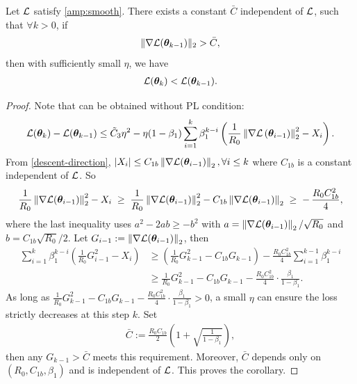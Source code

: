\begin{corollary}\label{cor:nablaL-large}
    Let $\mathcal{L}$ satisfy \cref{amp:smooth}. There exists a constant $\bar{C}$ independent of $\mathcal{L}$, such that $\forall k > 0$, if \begin{align*}
        \|\nabla \mathcal{L}({\bm{\theta}}_{k-1})\|_2 > \bar{C},
    \end{align*}
    then with sufficiently small $\eta$, we have \begin{align*}
        \mathcal{L}({\bm{\theta}}_k) < \mathcal{L}({\bm{\theta}}_{k-1}).
    \end{align*}
\end{corollary}
\begin{proof}
    Note that  can be obtained without PL condition: \begin{align*}
        \mathcal{L}({\bm{\theta}}_{k}) - \mathcal{L}({\bm{\theta}}_{k-1}) \leq \tilde{C}_3 \eta^2 - \eta (1-\beta_1) \sum_{i=1}^{k} \beta_1^{k-i} \left(\frac{1}{R_0}\left\|\nabla\mathcal{L}\left({\bm{\theta}}_{i-1}\right)\right\|_2^2 - X_i\right).
    \end{align*}
    From \cref{descent-direction}, $\left|X_i\right| \leq C_{1b}\left\|\nabla \mathcal{L}({\bm{\theta}}_{i-1})\right\|_2, \forall i \leq k$ where $C_{1b}$ is a constant independent of $\mathcal{L}$. So
\begin{align*}
\frac{1}{R_0}\left\|\nabla\mathcal{L}({\bm{\theta}}_{i-1})\right\|_2^2 - X_i
\;\ge\; \frac{1}{R_0}\left\|\nabla\mathcal{L}({\bm{\theta}}_{i-1})\right\|_2^2 - C_{1b}\left\|\nabla\mathcal{L}({\bm{\theta}}_{i-1})\right\|_2
\;\ge\; -\,\frac{R_0 C_{1b}^2}{4},
\end{align*}
where the last inequality uses $a^2 - 2ab \ge -b^2$ with $a=\left\|\nabla\mathcal{L}({\bm{\theta}}_{i-1})\right\|_2/\sqrt{R_0}$ and
$b=C_{1b}\sqrt{R_0}/2$. 
Let $G_{i-1}:=\left\|\nabla\mathcal{L}({\bm{\theta}}_{i-1})\right\|_2$, then
\begin{align*}
\sum_{i=1}^{k} \beta_1^{k-i}\left(\frac{1}{R_0}G_{i-1}^2 - X_i\right)
&\ge \left(\frac{1}{R_0}G_{k-1}^2 - C_{1b} G_{k-1}\right)
   - \frac{R_0 C_{1b}^2}{4}\sum_{i=1}^{k-1} \beta_1^{k-i} \\
&\ge \frac{1}{R_0}G_{k-1}^2 - C_{1b} G_{k-1}
   - \frac{R_0 C_{1b}^2}{4}\cdot\frac{\beta_1}{1-\beta_1}.
\end{align*}
As long as $\frac{1}{R_0}G_{k-1}^2 - C_{1b} G_{k-1}
   - \frac{R_0 C_{1b}^2}{4}\cdot\frac{\beta_1}{1-\beta_1} > 0$, a small $\eta$ can ensure the loss strictly decreases at this step $k$. Set 
\begin{align*}
    \bar{C} := \frac{R_0 C_{1b}}{2}\left(1 + \sqrt{\frac{1}{1-\beta_1}}\right),
\end{align*}
then any $G_{k-1} > \bar{C}$ meets this requirement. Moreover, $\bar{C}$ depends only on $(R_0,C_{1b},\beta_1)$ and is independent of $\mathcal{L}$. This proves the corollary.
\end{proof}

